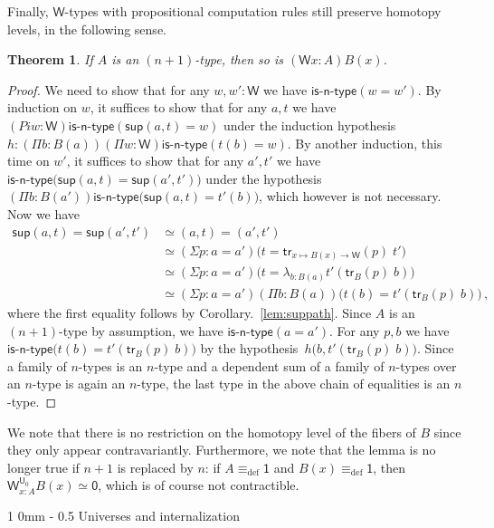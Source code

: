 \documentclass[reqno,10pt,a4paper,oneside]{amsart}
\makeatletter
\numberwithin{equation}{section}
\renewcommand{\section}{\@startsection
  {section}%
   {1}%
  {0mm}%
   {-\baselineskip}%
  {0.5\baselineskip}%
   {\Large\bfseries}}%
\theoremstyle{mythm}
\newtheorem{theorem}{Theorem}[section]
\theoremstyle{mydef}
\theoremstyle{myrmk}
\newcommand{\deq}{\equiv}
\newcommand{\defeq}{\deq_{\mathrm{def}}}
\newcommand{\isntype}[1]{\mathsf{is}\text{-}\mathsf{#1}\text{-}\mathsf{type}}
\newcommand{\trans}{\mathsf{tr}}
\newcommand{\lam}[1]{\lambda_{#1}}
\newcommand{\W}{\mathsf{W}}
\newcommand{\wsup}{\mathsf{sup}}
\newcommand{\one}{\mathsf{1}}
\newcommand{\zero}{\mathsf{0}}
\newcommand{\UU}{\mathsf{U}}
\makeatother
\begin{document}
Finally, $\W$-types with propositional computation rules still preserve homotopy levels, in the following sense.

\begin{theorem}
If $A$ is an $(n+1)$-type, then so is $(\W x:A)B(x)$.
\end{theorem}


\begin{proof}
We need to show that for any $w, w' : \W$ we have $\isntype{n}(w = w')$. By induction on $w$, it suffices to show that for any $a,t$ we have $(Pi w:\W) \isntype{n}(\wsup(a,t) = w)$ under the induction hypothesis $h : (\Pi b:B(a)) (\Pi w:\W) \isntype{n}(t(b) = w)$.  By another induction, this time on $w'$, it suffices to show that for any $a',t'$ we have
$\isntype{n}\big(\wsup(a,t) = \wsup(a',t')\big)$ under the hypothesis $(\Pi b:B(a')) \isntype{n}\big(\wsup(a,t) = t'(b)\big)$, which however is not necessary. Now we have
\begin{align*} 
\wsup(a,t) = \wsup(a',t') 
& \simeq (a,t) = (a',t') \\
& \simeq (\Sigma p : a = a') \big(t = \trans_{x \mapsto B(x) \to \W}(p) \; t'\big) \\
& \simeq  (\Sigma p : a = a')  \big(t = \lam{b:B(a)} t'(\trans_B(p) \; b)\big) \\
& \simeq (\Sigma p : a = a') (\Pi b:B(a)) \big(t(b) = t'(\trans_B(p) \; b)\big) \, , 
\end{align*}
where the first equality follows by Corollary.~\ref{lem:suppath}. Since $A$ is an $(n+1)$-type by assumption, we have $\isntype{n}(a=a')$. For any $p,b$ we have $\isntype{n}\big(t(b) = t'(\trans_B(p) \; b)\big)$ by the hypothesis~$h\big(b,t'(\trans_B(p) \; b)\big)$. Since a family of $n$-types is an $n$-type and a dependent sum of a family of $n$-types over an $n$-type is again an $n$-type, the last type in the above chain of equalities is an $n$-type. 
\end{proof}

We note that there is no restriction on the homotopy level of the fibers of $B$ since they only appear contravariantly. Furthermore, we note that the lemma is no longer true if $n+1$ is replaced by $n$: if $A \defeq \one$ and $B(x) \defeq \one$, then $\W^{\UU_0}_{x:A} B(x) \simeq \zero$, which is of course not contractible. 

\section{Universes and internalization}
\end{document}
